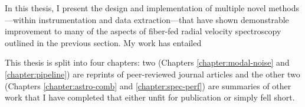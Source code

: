 In this thesis, I present the design and implementation of multiple novel methods---within instrumentation and data extraction---that have shown demonstrable improvement to many of the aspects of fiber-fed radial velocity spectroscopy outlined in the previous section. My work has entailed 

This thesis is split into four chapters: two (Chapters \ref{chapter:modal-noise} and \ref{chapter:pipeline}) are reprints of peer-reviewed journal articles and the other two (Chapters \ref{chapter:astro-comb} and \ref{chapter:spec-perf}) are summaries of other work that I have completed that either unfit for publication or simply fell short.